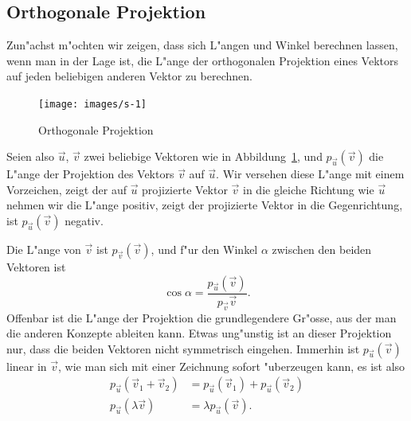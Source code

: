 \subsection{Orthogonale Projektion}
Zun"achst m"ochten wir zeigen, dass sich L"angen und Winkel berechnen
lassen, wenn man in der Lage ist, die L"ange der orthogonalen Projektion
eines Vektors auf jeden beliebigen anderen Vektor zu berechnen.
\begin{figure}
\begin{center}
\texttt{[image: images/s-1]}
\end{center}
\caption{Orthogonale Projektion\label{orthproj}}
\end{figure}

Seien also $\vec u$, $\vec v$ zwei beliebige Vektoren wie in Abbildung~\ref{orthproj}, und $p_{\vec u}(\vec v)$
die L"ange der Projektion des Vektors $\vec v$ auf $\vec u$.
Wir versehen diese L"ange mit einem Vorzeichen, zeigt der auf $\vec u$
projizierte Vektor $\vec v$ in die gleiche Richtung wie $\vec u$
nehmen wir die L"ange positiv, zeigt der projizierte Vektor in die
Gegenrichtung, ist $p_{\vec u}(\vec v)$ negativ.

Die L"ange von $\vec v$ ist $p_{\vec v}(\vec v)$, und f"ur den Winkel
$\alpha$ zwischen den beiden Vektoren ist
\begin{equation}
\cos \alpha = \frac{p_{\vec u}(\vec v)}{p_{\vec v}{\vec v}}.
\label{zwischenwinkel}
\end{equation}
Offenbar ist die L"ange der Projektion die grundlegendere Gr"osse,
aus der man die anderen Konzepte ableiten kann.
Etwas ung"unstig ist an dieser Projektion nur, dass die beiden Vektoren nicht
symmetrisch eingehen.
Immerhin ist $p_{\vec u}(\vec v)$ linear in $\vec v$, wie man
sich mit einer
Zeichnung sofort "uberzeugen kann, es ist also
\begin{align*}
p_{\vec u}(\vec v_1+\vec v_2)&=p_{\vec u}(\vec v_1)+p_{\vec u}(\vec v_2)\\
p_{\vec u}(\lambda \vec v)&=\lambda p_{\vec u}(\vec v).
\end{align*}

